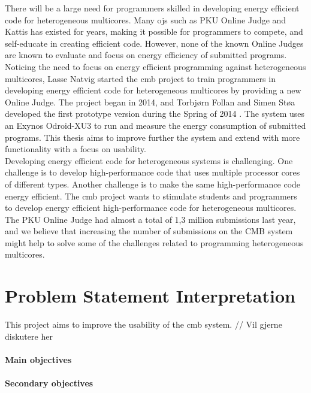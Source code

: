 There will be a large need for programmers skilled in developing energy efficient code for heterogeneous multicores. Many \gls{ojs} such as PKU Online Judge and Kattis has existed for years, making it possible for programmers to compete, and self-educate in creating efficient code. However, none of the known Online Judges are known to evaluate and focus on energy efficiency of submitted programs. Noticing the need to focus on energy efficient programming against heterogeneous multicores, Lasse Natvig started the \gls{cmb} project to train programmers in developing energy efficient code for heterogeneous multicores by providing a new Online Judge. The project began in 2014, and Torbjørn Follan and Simen Støa developed the first prototype version during the Spring of 2014 \cite{mt:T&S}. The system uses an Exynos Odroid-XU3 \cite{XU3} to run and measure the energy consumption of submitted programs. This thesis aims to improve further the system and extend with more functionality with a focus on usability. \\

Developing energy efficient code for heterogeneous systems is challenging. One challenge is to develop high-performance code that uses multiple processor cores of different types. Another challenge is to make the same high-performance code energy efficient. The \gls{cmb} project wants to stimulate students and programmers to develop energy efficient high-performance code for heterogeneous multicores. The PKU Online Judge \cite{PKU} had almost a total of 1,3 million submissions last year, and we believe that increasing the number of submissions on the CMB system might help to solve some of the challenges related to programming heterogeneous multicores. \\

\clearpage

\section{Problem Statement Interpretation}
\label{sec:rq}
This project aims to improve the usability of the \gls{cmb} system.
// Vil gjerne diskutere her


\paragraph*{Main objectives} \hfill


\paragraph*{Secondary objectives} \hfill



